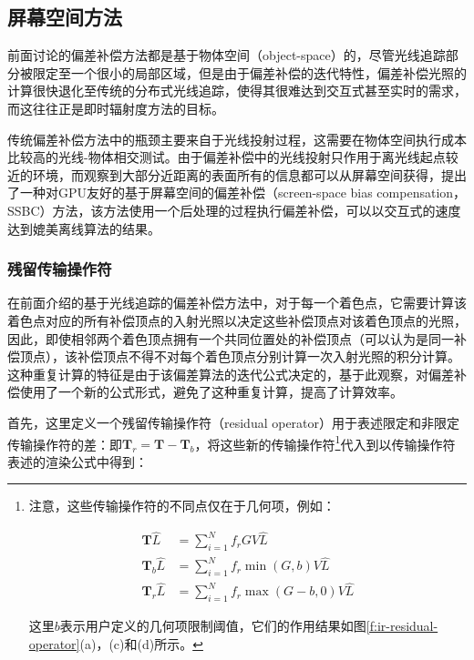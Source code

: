 \subsection{屏幕空间方法}
前面讨论的偏差补偿方法都是基于物体空间（object-space）的，尽管光线追踪部分被限定至一个很小的局部区域，但是由于偏差补偿的迭代特性，偏差补偿光照的计算很快退化至传统的分布式光线追踪，使得其很难达到交互式甚至实时的需求，而这往往正是即时辐射度方法的目标。

传统偏差补偿方法中的瓶颈主要来自于光线投射过程，这需要在物体空间执行成本比较高的光线-物体相交测试。由于偏差补偿中的光线投射只作用于离光线起点较近的环境，而观察到大部分近距离的表面所有的信息都可以从屏幕空间获得，\cite{a:Screen-SpaceBiasCompensationfor}提出了一种对GPU友好的基于屏幕空间的偏差补偿（screen-space bias compensation，SSBC）方法，该方法使用一个后处理的过程执行偏差补偿，可以以交互式的速度达到媲美离线算法的结果。




\subsubsection{残留传输操作符}
在前面介绍的基于光线追踪的偏差补偿方法中，对于每一个着色点，它需要计算该着色点对应的所有补偿顶点的入射光照以决定这些补偿顶点对该着色顶点的光照，因此，即使相邻两个着色顶点拥有一个共同位置处的补偿顶点（可以认为是同一补偿顶点），该补偿顶点不得不对每个着色顶点分别计算一次入射光照的积分计算。这种重复计算的特征是由于该偏差算法的迭代公式决定的，基于此观察，\cite{a:Screen-SpaceBiasCompensationfor}对偏差补偿使用了一个新的公式形式，避免了这种重复计算，提高了计算效率。

首先，这里定义一个残留传输操作符（residual operator）用于表述限定和非限定传输操作符的差：即$\mathbf{T}_r = \mathbf{T}-\mathbf{T}_b$，将这些新的传输操作符\footnote{
注意，这些传输操作符的不同点仅在于几何项，例如：

\begin{equation*}
\begin{aligned}
	\mathbf{T}\hat{L}  &=\sum^{N}_{i=1}f_rGV\hat{L}\\
	\mathbf{T}_b\hat{L}&=\sum^{N}_{i=1}f_r \min(G,b)V\hat{L}\\
	\mathbf{T}_r\hat{L}&=\sum^{N}_{i=1}f_r \max(G-b,0)V\hat{L}
\end{aligned}
\end{equation*}

这里$b$表示用户定义的几何项限制阈值，它们的作用结果如图\ref{f:ir-residual-operator}(a)，(c)和(d)所示。 
}代入到以传输操作符表述的渲染公式中得到：

